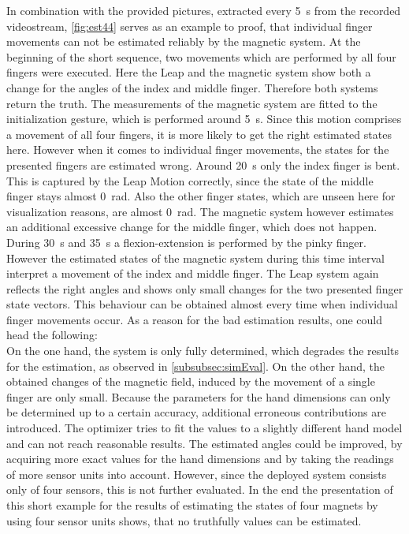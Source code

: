 In combination with the provided pictures, extracted every \SI{5}{\second} from the recorded videostream, \ref{fig:est44} serves as an example to proof, that individual finger movements can not be estimated reliably by the magnetic system. At the beginning of the short sequence, two movements which are performed by all four fingers were executed. Here the Leap and the magnetic system show both a change for the angles of the index and middle finger. Therefore both systems return the truth. The measurements of the magnetic system are fitted to the initialization gesture, which is performed around \SI{5}{\second}. Since this motion comprises a movement of all four fingers, it is more likely to get the right estimated states here. However when it comes to individual finger movements, the states for the presented fingers are estimated wrong. Around \SI{20}{\second} only the index finger is bent. This is captured by the Leap Motion correctly, since the state of the middle finger stays almost \SI{0}{\radian}. Also the other finger states, which are unseen here for visualization reasons, are almost \SI{0}{\radian}. The magnetic system however estimates an additional excessive change for the middle finger, which does not happen. During \SI{30}{\second} and \SI{35}{\second} a flexion-extension is performed by the pinky finger. However the estimated states of the magnetic system during this time interval interpret a movement of the index and middle finger. The Leap system again reflects the right angles and shows only small changes for the two presented finger state vectors. This behaviour can be obtained almost every time when individual finger movements occur. As a reason for the bad estimation results, one could head the following:\\ 
On the one hand, the system is only fully determined, which degrades the results for the estimation, as observed in \ref{subsubsec:simEval}. On the other hand, the obtained changes of the magnetic field, induced by the movement of a single finger are only small. Because the parameters for the hand dimensions can only be determined up to a certain accuracy, additional erroneous contributions are introduced. The optimizer tries to fit the values to a slightly different hand model and can not reach reasonable results. The estimated angles could be improved, by acquiring more exact values for the hand dimensions and by taking the readings of more sensor units into account. However, since the deployed system consists only of four sensors, this is not further evaluated. In the end the presentation of this short example for the results of estimating the states of four magnets by using four sensor units shows, that no truthfully values can be estimated.
\FloatBarrier

